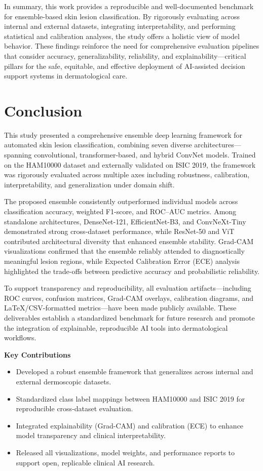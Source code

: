 \documentclass[pdflatex,sn-mathphys-num]{sn-jnl}%
\theoremstyle{thmstyleone}%
\theoremstyle{thmstyletwo}%
\theoremstyle{thmstylethree}%
\begin{document}
In summary, this work provides a reproducible and well-documented benchmark for ensemble-based skin lesion classification. By rigorously evaluating across internal and external datasets, integrating interpretability, and performing statistical and calibration analyses, the study offers a holistic view of model behavior. These findings reinforce the need for comprehensive evaluation pipelines that consider accuracy, generalizability, reliability, and explainability—critical pillars for the safe, equitable, and effective deployment of AI-assisted decision support systems in dermatological care.

\section{Conclusion}\label{sec11}

This study presented a comprehensive ensemble deep learning framework for automated skin lesion classification, combining seven diverse architectures—spanning convolutional, transformer-based, and hybrid ConvNet models. Trained on the HAM10000 dataset and externally validated on ISIC 2019, the framework was rigorously evaluated across multiple axes including robustness, calibration, interpretability, and generalization under domain shift.

The proposed ensemble consistently outperformed individual models across classification accuracy, weighted F1-score, and ROC–AUC metrics. Among standalone architectures, DenseNet-121, EfficientNet-B3, and ConvNeXt-Tiny demonstrated strong cross-dataset performance, while ResNet-50 and ViT contributed architectural diversity that enhanced ensemble stability. Grad-CAM visualizations confirmed that the ensemble reliably attended to diagnostically meaningful lesion regions, while Expected Calibration Error (ECE) analysis highlighted the trade-offs between predictive accuracy and probabilistic reliability.

To support transparency and reproducibility, all evaluation artifacts—including ROC curves, confusion matrices, Grad-CAM overlays, calibration diagrams, and LaTeX/CSV-formatted metrics—have been made publicly available. These deliverables establish a standardized benchmark for future research and promote the integration of explainable, reproducible AI tools into dermatological workflows.

\vspace{1em}
\noindent\textbf{Key Contributions}
\begin{itemize}
    \item Developed a robust ensemble framework that generalizes across internal and external dermoscopic datasets.
    \item Standardized class label mappings between HAM10000 and ISIC 2019 for reproducible cross-dataset evaluation.
    \item Integrated explainability (Grad-CAM) and calibration (ECE) to enhance model transparency and clinical interpretability.
    \item Released all visualizations, model weights, and performance reports to support open, replicable clinical AI research.
\end{itemize}
\end{document}
